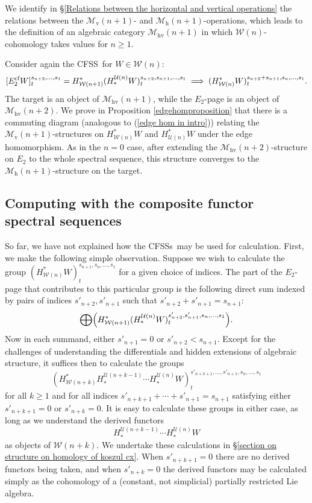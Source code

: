 \documentclass[11pt]{amsart} \renewcommand{\baselinestretch}{1.2}
\theoremstyle{plain}
\numberwithin{equation}{section} %
\theoremstyle{plain}
\numberwithin{equation}{chapter} %
\newcommand{\calW}{\mathcal{W}}
\newcommand{\calU}{\mathcal{U}}
\newcommand{\calw}{\mathcal{W}}
\newcommand{\calu}{\mathcal{U}}
\newcommand{\calMv}{\mathcal{M}\dver}
\newcommand{\calMh}{\mathcal{M}\dhor}
\newcommand{\calMhv}{\mathcal{M}_\mathrm{hv}}
\newcommand{\E}[5]{[E^{#1}_{#2}#3]^{#4}_{#5}}
\newcommand{\dver}{_\mathrm{v}}
\newcommand{\dhor}{_\mathrm{h}}
\newcommand{\Sqv}{\mathrm{Sq}\dver}
\newcommand{\CFSS}{CFSS}
\newcommand{\CFSSs}{CFSSs}
\newcommand{\SubsectionOrSection}[1]{\subsection{#1}}
\begin{document}
\begin{Introduction}
We identify in \S\ref{Relations between the horizontal and vertical operations} the relations between the $\calMv(n+1)$- and $\calMh(n+1)$-operations, which leads to the definition of an algebraic category $\calMhv(n+1)$ in which $\calw(n)$-cohomology takes values for $n\geq1$.

Consider again the \CFSS\ for $W\in\calw(n)$:
\[\E{\textup{cf}}{2}{W}{s_{n+2},\ldots,s_1}{t}=H^*_{\calw(n+1)}(H_*^{\calu(n)}W)^{s_{n+2},s_{n+1},\ldots,s_1}_t\implies (H^*_{\calw(n)} W)_t^{s_{n+2}+s_{n+1},s_n,\ldots,s_1}.\]
The target is an object of $\calMhv(n+1)$, while the $E_2$-page is an object of $\calMhv(n+2)$. %
We prove in Proposition \ref{edgehomproposition} that there is a commuting diagram (analogous to (\ref{edge hom in intro})) relating the $\calMv(n+1)$-structures on $H^*_{\calw(n)}W$ and $H^*_{\calU(n)}W$ under the edge homomorphism.
As in the $n=0$ case, after extending the $\calMhv(n+2)$-structure on $E_2$ to the whole spectral sequence, this structure converges to the $\calMh(n+1)$-structure on the target.

\SubsectionOrSection{Computing with the composite functor spectral sequences}
\label{Computing with the composite functor spectral sequences}
So far, we have not explained how the \CFSSs\ may be used for calculation. First, we make the following simple observation. Suppose we wish to calculate the group $(H^*_{\calw(n)} W)_t^{s_{n+1},s_n,\ldots,s_1}$ for a given choice of indices. The part of the $E_2$-page that contributes to this particular group is the following direct sum indexed by pairs of indices $s'_{n+2},s'_{n+1}$ such that  $s'_{n+2}+s'_{n+1}=s_{n+1}$:
\[\bigoplus \Bigl(H^*_{\calw(n+1)}(H_*^{\calu(n)}W)^{s'_{n+2},s'_{n+1},s_n,\ldots,s_1}_{t}\Bigr).\]
Now in each summand, either $s'_{n+1}=0$ or $s'_{n+2}<s_{n+1}$. Except for the challenges of understanding the differentials and hidden extensions of algebraic structure, it suffices then to calculate the groups
\[(H^{*}_{\calW(n+k)}H_*^{\calu(n+k-1)}\cdots H_*^{\calu(n)}W)^{s'_{n+k+1},\ldots,s'_{n+1},s_n,\ldots,s_1}_{t}\]
for all $k\geq1$ and for all indices $s'_{n+k+1}+\cdots+s'_{n+1}=s_{n+1}$ satisfying either $s'_{n+k+1}=0$ or $s'_{n+k}=0$. 
It is easy to calculate these groups in either case, as long as we understand the derived functors
\[H_*^{\calu(n+k-1)}\cdots H_*^{\calu(n)}W\]
 as objects of $\calw(n+k)$. We undertake these calculations in \S\ref{section on structure on homology of koszul cx}. When $s'_{n+k+1}=0$ there are no derived functors being taken, and when $s'_{n+k}=0$ the derived functors may be calculated simply as the cohomology of a (constant, not simplicial) partially restricted Lie algebra.


\end{Introduction}
\end{document}
